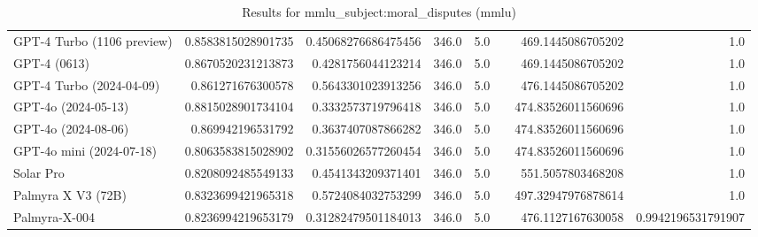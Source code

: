 \begin{table}[htp]
{\begin{tabular}{lrrrrrrr}
GPT-4 Turbo (1106 preview) & 0.8583815028901735 & 0.45068276686475456 & 346.0 & 5.0 &  & 469.1445086705202 & 1.0 \\
GPT-4 (0613) & 0.8670520231213873 & 0.4281756044123214 & 346.0 & 5.0 &  & 469.1445086705202 & 1.0 \\
GPT-4 Turbo (2024-04-09) & 0.861271676300578 & 0.5643301023913256 & 346.0 & 5.0 &  & 476.1445086705202 & 1.0 \\
GPT-4o (2024-05-13) & 0.8815028901734104 & 0.3332573719796418 & 346.0 & 5.0 &  & 474.83526011560696 & 1.0 \\
GPT-4o (2024-08-06) & 0.869942196531792 & 0.3637407087866282 & 346.0 & 5.0 &  & 474.83526011560696 & 1.0 \\
GPT-4o mini (2024-07-18) & 0.8063583815028902 & 0.31556026577260454 & 346.0 & 5.0 &  & 474.83526011560696 & 1.0 \\
Solar Pro & 0.8208092485549133 & 0.4541343209371401 & 346.0 & 5.0 &  & 551.5057803468208 & 1.0 \\
Palmyra X V3 (72B) & 0.8323699421965318 & 0.5724084032753299 & 346.0 & 5.0 &  & 497.32947976878614 & 1.0 \\
Palmyra-X-004 & 0.8236994219653179 & 0.31282479501184013 & 346.0 & 5.0 &  & 476.1127167630058 & 0.9942196531791907 \\
\bottomrule
\end{tabular}}
\caption{Results for mmlu_subject:moral_disputes (mmlu)}
\label{fig:mmlu_subject:moral_disputes (mmlu)}
\end{table}